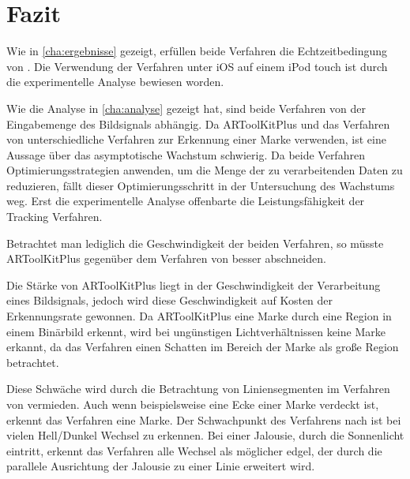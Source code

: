 \chapter{Fazit} %
\label{cha:fazit}

Wie in \autoref{cha:ergebnisse} gezeigt, erfüllen beide Verfahren die Echtzeitbedingung von \citeauthor{azuma97}. Die Verwendung der Verfahren unter iOS auf einem iPod touch ist durch die experimentelle Analyse bewiesen worden.

Wie die Analyse in \autoref{cha:analyse} gezeigt hat, sind beide Verfahren von der Eingabemenge des Bildsignals abhängig. Da ARToolKitPlus und das Verfahren von \citeauthor{hirzer} unterschiedliche Verfahren zur Erkennung einer Marke verwenden, ist eine Aussage über das asymptotische Wachstum schwierig. Da beide Verfahren Optimierungsstrategien anwenden, um die Menge der zu verarbeitenden Daten zu reduzieren, fällt dieser Optimierungsschritt in der Untersuchung des Wachstums weg. Erst die experimentelle Analyse offenbarte die Leistungsfähigkeit der Tracking Verfahren.

Betrachtet man lediglich die Geschwindigkeit der beiden Verfahren, so müsste ARToolKitPlus gegenüber dem Verfahren von \citeauthor{hirzer08} besser abschneiden.

Die Stärke von ARToolKitPlus liegt in der Geschwindigkeit der Verarbeitung eines Bildsignals, jedoch wird diese Geschwindigkeit auf Kosten der Erkennungsrate gewonnen. Da ARToolKitPlus eine Marke durch eine Region in einem Binärbild erkennt, wird bei ungünstigen Lichtverhältnissen keine Marke erkannt, da das Verfahren einen Schatten im Bereich der Marke als große Region betrachtet.

Diese Schwäche wird durch die Betrachtung von Liniensegmenten im Verfahren von \citeauthor{hirzer08} vermieden. Auch wenn beispielsweise eine Ecke einer Marke verdeckt ist, erkennt das Verfahren eine Marke. Der Schwachpunkt des Verfahrens nach \citeauthor{hizer08} ist bei vielen Hell/Dunkel Wechsel zu erkennen. Bei einer Jalousie, durch die Sonnenlicht eintritt, erkennt das Verfahren alle Wechsel als möglicher \gls{edgel}, der durch die parallele Ausrichtung der Jalousie zu einer Linie erweitert wird.





